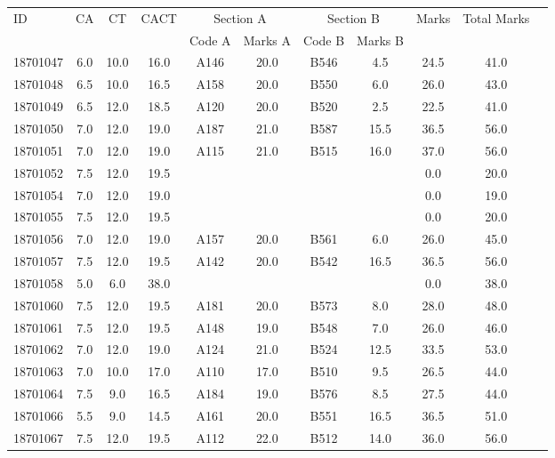 \documentclass[12pt]{article}
\begin{document}
    \begin{center} 
	\renewcommand{\arraystretch}{1.08}
	\begin{small}
    \begin{tabular}{|l|c|c|c|c|c|c|c|c|c|c|} \hline
	\multirow{2}{*}{ID} & 	\multirow{2}{*}{CA}  & 	\multirow{2}{*}{CT}  & 	\multirow{2}{*}{CACT}  & \multicolumn{2 }{|c|}{Section A}& \multicolumn{2 }{c|}{Section B} & 	\multirow{2}{*}{Marks}  & 	\multirow{2}{*}{Total Marks}  \\ 
	&  &  &  & Code A & Marks A & Code B & Marks B&  &  \\ \hline
18701047 & 6.0 & 10.0 & 16.0 & A146 & 20.0 & B546 & 4.5 & 24.5 & 41.0\\ \hline 
18701048 & 6.5 & 10.0 & 16.5 & A158 & 20.0 & B550 & 6.0 & 26.0 & 43.0\\ \hline 
18701049 & 6.5 & 12.0 & 18.5 & A120 & 20.0 & B520 & 2.5 & 22.5 & 41.0\\ \hline 
18701050 & 7.0 & 12.0 & 19.0 & A187 & 21.0 & B587 & 15.5 & 36.5 & 56.0\\ \hline 
18701051 & 7.0 & 12.0 & 19.0 & A115 & 21.0 & B515 & 16.0 & 37.0 & 56.0\\ \hline 
18701052 & 7.5 & 12.0 & 19.5 &  &  &  &  & 0.0 & 20.0\\ \hline 
18701054 & 7.0 & 12.0 & 19.0 &  &  &  &  & 0.0 & 19.0\\ \hline 
18701055 & 7.5 & 12.0 & 19.5 &  &  &  &  & 0.0 & 20.0\\ \hline 
18701056 & 7.0 & 12.0 & 19.0 & A157 & 20.0 & B561 & 6.0 & 26.0 & 45.0\\ \hline 
18701057 & 7.5 & 12.0 & 19.5 & A142 & 20.0 & B542 & 16.5 & 36.5 & 56.0\\ \hline 
18701058 & 5.0 & 6.0 & 38.0 &  &  &  &  & 0.0 & 38.0\\ \hline 
18701060 & 7.5 & 12.0 & 19.5 & A181 & 20.0 & B573 & 8.0 & 28.0 & 48.0\\ \hline 
18701061 & 7.5 & 12.0 & 19.5 & A148 & 19.0 & B548 & 7.0 & 26.0 & 46.0\\ \hline 
18701062 & 7.0 & 12.0 & 19.0 & A124 & 21.0 & B524 & 12.5 & 33.5 & 53.0\\ \hline 
18701063 & 7.0 & 10.0 & 17.0 & A110 & 17.0 & B510 & 9.5 & 26.5 & 44.0\\ \hline 
18701064 & 7.5 & 9.0 & 16.5 & A184 & 19.0 & B576 & 8.5 & 27.5 & 44.0\\ \hline 
18701066 & 5.5 & 9.0 & 14.5 & A161 & 20.0 & B551 & 16.5 & 36.5 & 51.0\\ \hline 
18701067 & 7.5 & 12.0 & 19.5 & A112 & 22.0 & B512 & 14.0 & 36.0 & 56.0\\ \hline 

\end{tabular}
\end{small}
\end{center}
\end{document}
